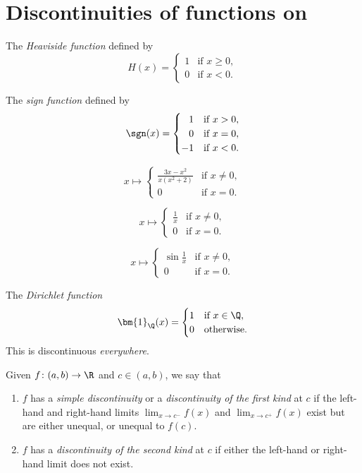 \section{Discontinuities of functions on \R} \label{sec:cont:dis}
\begin{examples}
    \item The \emph{Heaviside function} defined by \[
        H(x) = \begin{cases}
            1 & \text{if } x \ge 0, \\
            0 & \text{if } x < 0.
        \end{cases}
    \]
    \item The \emph{sign function} defined by \[
        \sgn(x) = \begin{cases}
            \hphantom{-}1  & \text{if } x > 0, \\
            \hphantom{-}0  & \text{if } x = 0, \\
            -1 & \text{if } x < 0.
        \end{cases}
    \]
    \item \[
        x \mapsto \begin{cases}
            \frac{3x - x^2}{x(x^2 + 2)} & \text{if } x \ne 0, \\
            0 & \text{if } x = 0.
        \end{cases}
    \]
    \item \[
        x \mapsto \begin{cases}
            \frac1{x} & \text{if } x \ne 0, \\
            0 & \text{if } x = 0.
        \end{cases}
    \]
    \item \[
        x \mapsto \begin{cases}
            \sin\frac1x & \text{if } x \ne 0, \\
            0 & \text{if } x = 0.
        \end{cases}
    \]
    \item The \emph{Dirichlet function} \[
        \bm{1}_{\Q}(x) = \begin{cases}
            1 & \text{if } x \in \Q, \\
            0 & \text{otherwise}.
        \end{cases}
    \] This is discontinuous \emph{everywhere}.
\end{examples}

\begin{definition*}
    Given $f\colon (a, b) \to \R$ and $c \in (a, b)$, we say that
    \begin{enumerate}
        \item $f$ has a \emph{simple discontinuity} or a \emph{discontinuity
            of the first kind} at $c$ if the left-hand and right-hand limits
            $\lim_{x \to c^-} f(x)$ and $\lim_{x \to c^+} f(x)$ exist but
            are either unequal, or unequal to $f(c)$.
        \item $f$ has a \emph{discontinuity of the second kind} at $c$ if
            either the left-hand or right-hand limit does not exist.
    \end{enumerate}
\end{definition*}

